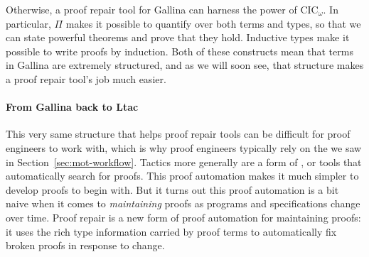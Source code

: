Otherwise, a proof repair tool for Gallina can harness the power of CIC$_{\omega}$.
In particular, $\Pi$ makes it possible to quantify over both terms and types,
so that we can state powerful theorems and prove that they hold.
Inductive types make it possible to write proofs by induction.
Both of these constructs mean that terms in Gallina are extremely structured,
and as we will soon see, that structure makes a proof repair tool's job much easier.

\paragraph{From Gallina back to Ltac}
This very same structure that helps proof repair tools can be difficult for proof engineers to work with,
which is why proof engineers typically rely on the   we saw in Section~\ref{sec:mot-workflow}.
Tactics more generally are a form of , or tools that automatically search for proofs.
This proof automation makes it much simpler to develop proofs to begin with.
But it turns out this proof automation is a bit naive when it comes to \textit{maintaining} proofs
as programs and specifications change over time.
Proof repair is a new form of proof automation for maintaining proofs: it uses the rich type information carried by proof terms
to automatically fix broken proofs in response to change.



